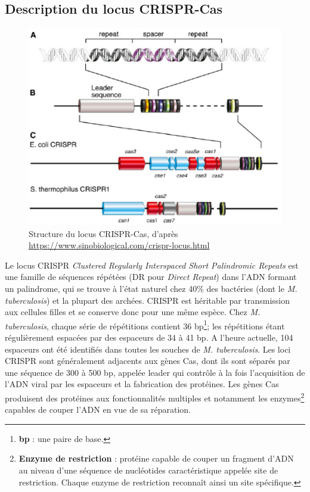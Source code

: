 \documentclass[twoside,a4paper,11pt,frenchb,openany]{report}
\begin{document}
\subsection{Description du locus CRISPR-Cas}

\begin{figure}[h!]
\centering
\includegraphics[scale=0.6]{crispr.png}
\caption{Structure du locus CRISPR-Cas, d'après\\ \url{https://www.sinobiological.com/crispr-locus.html}}
\end{figure}

Le locus CRISPR \textit{Clustered Regularly Interspaced Short Palindromic Repeats} est une famille de séquences répétées (DR pour \textit{Direct Repeat}) dans l'ADN formant un palindrome, qui se trouve à l'état naturel chez 40\% des bactéries (dont le \textit{M. tuberculosis}) et la plupart des archées. CRISPR est héritable par transmission aux cellules filles et se conserve donc pour une même espèce. Chez \textit{M. tuberculosis}, chaque série de répétitions contient 36 bp\footnote{\textbf{bp} : une paire de base.}; les répétitions étant régulièrement espacées par des espaceurs de 34 à 41 bp. A l'heure actuelle, 104 espaceurs ont été identifiés dans toutes les souches de \textit{M. tuberculosis}. Les loci CRISPR sont généralement adjacents aux gènes Cas, dont ils sont séparés par une séquence de 300 à 500 bp, appelée leader qui contrôle à la fois l'acquisition de l'ADN viral par les espaceurs et la fabrication des protéines. Les gènes Cas produisent des protéines aux fonctionnalités multiples et notamment les enzymes\footnote{\textbf{Enzyme de restriction} : protéine capable de couper un fragment d'ADN au niveau d'une séquence de nucléotides caractéristique appelée site de restriction. Chaque enzyme de restriction reconnaît ainsi un site spécifique.} capables de couper l'ADN en vue de sa réparation.
\end{document}
